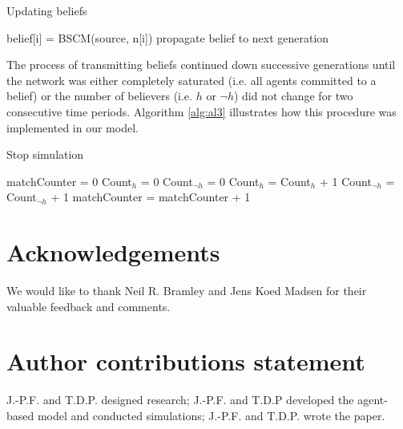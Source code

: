 \documentclass[fleqn,10pt]{wlscirep}
\begin{document}
\begin{algorithm}[H]
\caption{Updating beliefs}\label{update}
\begin{algorithmic}[1]
     \label{alg:al2}
             \State belief[i] = BSCM(source, n[i])
              \State propagate belief to next generation
              \EndIf
             \EndIf
        \EndFor
    \EndIf
  \EndProcedure
\end{algorithmic}
\end{algorithm}

The process of transmitting beliefs continued down successive generations until the network was either completely saturated (i.e. all agents committed to a belief) or the number of believers (i.e. \(h\) or \(\neg h\)) did not change for two consecutive time periods. Algorithm \ref{alg:al3} illustrates how this procedure was implemented in our model.

\begin{algorithm}[H]
\caption{Stop simulation}\label{proceed}
\begin{algorithmic}[1]
    \State matchCounter = 0 
    \State Count\(_{h}\) = 0
     \label{alg:al3}
    \State Count\(_{\neg h}\) = 0
            \State Count\(_{h}\) = Count\(_{h}\) + 1
        \EndIf
            \State Count\(_{\neg h}\) = Count\(_{\neg h }\) + 1
        \EndIf
    \EndFor
        \State matchCounter = matchCounter + 1
    \EndIf
  \EndProcedure
\end{algorithmic}
\end{algorithm}





\section*{Acknowledgements}
We would like to thank Neil R. Bramley and Jens Koed Madsen for their valuable feedback and comments. 

\section*{Author contributions statement}
J.-P.F. and T.D.P. designed research; J.-P.F. and T.D.P developed the agent-based model and conducted simulations; J.-P.F. and T.D.P. wrote the paper.
\end{document}
